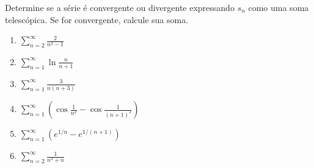 \item\label{5}
Determine se a série é convergente ou divergente expressando
$s_n$ como uma soma telescópica. Se for convergente, calcule sua soma.

\begin{multicols}{2}
    \begin{enumerate}
        \item $\displaystyle \sum_{n=2}^{\infty} \frac{2}{n^2 - 1}$
        \item $\displaystyle \sum_{n=1}^{\infty} \ln \frac{n}{n + 1}$
        \item $\displaystyle \sum_{n=1}^{\infty} \frac{3}{n(n + 3)}$
        \item $\displaystyle \sum_{n=1}^{\infty} \left( \cos \frac{1}{n^2} - \cos \frac{1}{(n+1)^2} \right)$
        \item $\displaystyle \sum_{n=1}^{\infty} \left( e^{1/n} - e^{1/(n+1)}\right)$
        \item $\displaystyle \sum_{n=2}^{\infty} \frac{1}{n^3 + n}$
    \end{enumerate}
\end{multicols}